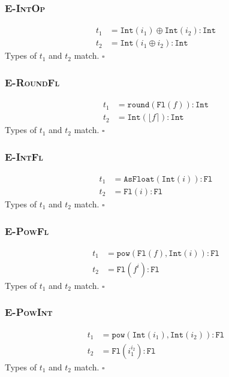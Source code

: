 \documentclass[13pt, a4paper]{article}
\begin{document}
\subsubsection*{\textmd{\textsc{E-IntOp}}}
\begin{align}
t_1 &= \texttt{Int}(i_1) \oplus \texttt{Int}(i_2) : \texttt{Int} \\
t_2 &= \texttt{Int}(i_1 \oplus i_2) : \texttt{Int}
\end{align}
Types of $t_1$ and $t_2$ match. $\square$

\subsubsection*{\textmd{\textsc{E-RoundFl}}}
\begin{align}
t_1 &= \texttt{round}(\texttt{Fl}(f)) : \texttt{Int} \\
t_2 &= \texttt{Int}(\lfloor f\rceil) : \texttt{Int}
\end{align}
Types of $t_1$ and $t_2$ match. $\square$

\subsubsection*{\textmd{\textsc{E-IntFl}}}
\begin{align}
t_1 &= \texttt{AsFloat}(\texttt{Int}(i)) : \texttt{Fl} \\
t_2 &= \texttt{Fl}(i) : \texttt{Fl}
\end{align}
Types of $t_1$ and $t_2$ match. $\square$

\subsubsection*{\textmd{\textsc{E-PowFl}}}
\begin{align}
t_1 &= \texttt{pow}(\texttt{Fl}(f),\texttt{Int}(i)) : \texttt{Fl} \\
t_2 &= \texttt{Fl}(f^i) : \texttt{Fl}
\end{align}
Types of $t_1$ and $t_2$ match. $\square$

\subsubsection*{\textmd{\textsc{E-PowInt}}}
\begin{align}
t_1 &= \texttt{pow}(\texttt{Int}(i_1),\texttt{Int}(i_2)) : \texttt{Fl} \\
t_2 &= \texttt{Fl}(i_1^{i_2}) : \texttt{Fl}
\end{align}
Types of $t_1$ and $t_2$ match. $\square$
\end{document}
